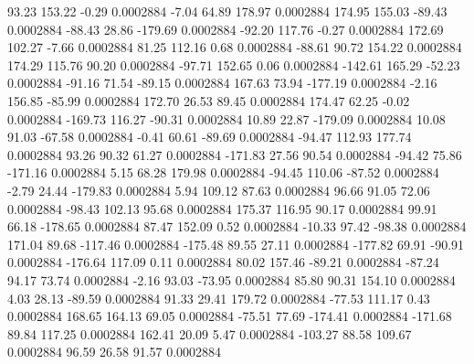        93.23      153.22       -0.29     0.0002884
       -7.04       64.89      178.97     0.0002884
      174.95      155.03      -89.43     0.0002884
      -88.43       28.86     -179.69     0.0002884
      -92.20      117.76       -0.27     0.0002884
      172.69      102.27       -7.66     0.0002884
       81.25      112.16        0.68     0.0002884
      -88.61       90.72      154.22     0.0002884
      174.29      115.76       90.20     0.0002884
      -97.71      152.65        0.06     0.0002884
     -142.61      165.29      -52.23     0.0002884
      -91.16       71.54      -89.15     0.0002884
      167.63       73.94     -177.19     0.0002884
       -2.16      156.85      -85.99     0.0002884
      172.70       26.53       89.45     0.0002884
      174.47       62.25       -0.02     0.0002884
     -169.73      116.27      -90.31     0.0002884
       10.89       22.87     -179.09     0.0002884
       10.08       91.03      -67.58     0.0002884
       -0.41       60.61      -89.69     0.0002884
      -94.47      112.93      177.74     0.0002884
       93.26       90.32       61.27     0.0002884
     -171.83       27.56       90.54     0.0002884
      -94.42       75.86     -171.16     0.0002884
        5.15       68.28      179.98     0.0002884
      -94.45      110.06      -87.52     0.0002884
       -2.79       24.44     -179.83     0.0002884
        5.94      109.12       87.63     0.0002884
       96.66       91.05       72.06     0.0002884
      -98.43      102.13       95.68     0.0002884
      175.37      116.95       90.17     0.0002884
       99.91       66.18     -178.65     0.0002884
       87.47      152.09        0.52     0.0002884
      -10.33       97.42      -98.38     0.0002884
      171.04       89.68     -117.46     0.0002884
     -175.48       89.55       27.11     0.0002884
     -177.82       69.91      -90.91     0.0002884
     -176.64      117.09        0.11     0.0002884
       80.02      157.46      -89.21     0.0002884
      -87.24       94.17       73.74     0.0002884
       -2.16       93.03      -73.95     0.0002884
       85.80       90.31      154.10     0.0002884
        4.03       28.13      -89.59     0.0002884
       91.33       29.41      179.72     0.0002884
      -77.53      111.17        0.43     0.0002884
      168.65      164.13       69.05     0.0002884
      -75.51       77.69     -174.41     0.0002884
     -171.68       89.84      117.25     0.0002884
      162.41       20.09        5.47     0.0002884
     -103.27       88.58      109.67     0.0002884
       96.59       26.58       91.57     0.0002884

